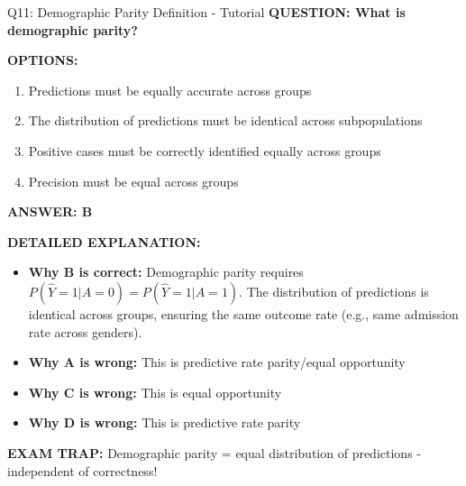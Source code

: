 \documentclass[8pt]{beamer}
\begin{document}
	\begin{frame}{Q11: Demographic Parity Definition - Tutorial}
		\fontsize{6.5}{7.5}\selectfont
		\textbf{QUESTION: What is demographic parity?}
		
		\vspace{0.1cm}
		\textbf{OPTIONS:}
		\begin{enumerate}
			\item Predictions must be equally accurate across groups
			\item The distribution of predictions must be identical across subpopulations
			\item Positive cases must be correctly identified equally across groups
			\item Precision must be equal across groups
		\end{enumerate}
		
		\vspace{0.1cm}
		\textcolor{myblue}{\textbf{ANSWER: B}}
		
		\vspace{0.1cm}
		\textbf{DETAILED EXPLANATION:}
		\begin{itemize}
			\item \textbf{Why B is correct:} Demographic parity requires $P(\hat{Y}=1|A=0) = P(\hat{Y}=1|A=1)$. The distribution of predictions is identical across groups, ensuring the same outcome rate (e.g., same admission rate across genders).
			\item \textbf{Why A is wrong:} This is predictive rate parity/equal opportunity
			\item \textbf{Why C is wrong:} This is equal opportunity
			\item \textbf{Why D is wrong:} This is predictive rate parity
		\end{itemize}
		
		\textcolor{myred}{\textbf{EXAM TRAP:}} Demographic parity = \textcolor{myblue}{equal distribution of predictions} - independent of correctness!
	\end{frame}
	
\end{document}
